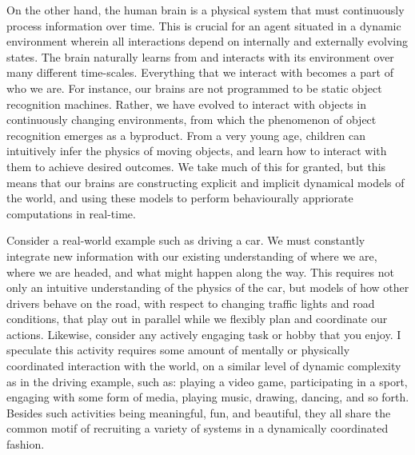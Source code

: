 On the other hand, the human brain is a physical system that must continuously process information over time.
This is crucial for an agent situated in a dynamic environment wherein all interactions depend on internally and externally evolving states.
The brain naturally learns from and interacts with its environment over many different time-scales. 
Everything that we interact with becomes a part of who we are.
For instance, our brains are not programmed to be static object recognition machines. Rather, we have evolved to interact with objects in continuously changing environments, from which the phenomenon of object recognition emerges as a byproduct.
From a very young age, children can intuitively infer the physics of moving objects, and learn how to interact with them to achieve desired outcomes.
We take much of this for granted, but this means that our brains are constructing explicit and implicit dynamical models of the world, and using these models
to perform behaviourally appriorate computations in real-time.

Consider a real-world example such as driving a car. We must constantly integrate new information with our existing understanding of where we are, where we are headed, and what might happen along the way.
This requires not only an intuitive understanding of the physics of the car, but models of how other drivers behave on the road, with respect to changing traffic lights and road conditions, that play out in parallel while we flexibly plan and coordinate our actions.
Likewise, consider any actively engaging task or hobby that you enjoy.
I speculate this activity requires some amount of mentally or physically coordinated interaction with the world, on a similar level of dynamic complexity as in the driving example, such as: playing a video game, participating in a sport, engaging with some form of media, playing music, drawing, dancing, and so forth.
Besides such activities being meaningful, fun, and beautiful, they all share the common motif of recruiting a variety of systems in a dynamically coordinated fashion.

